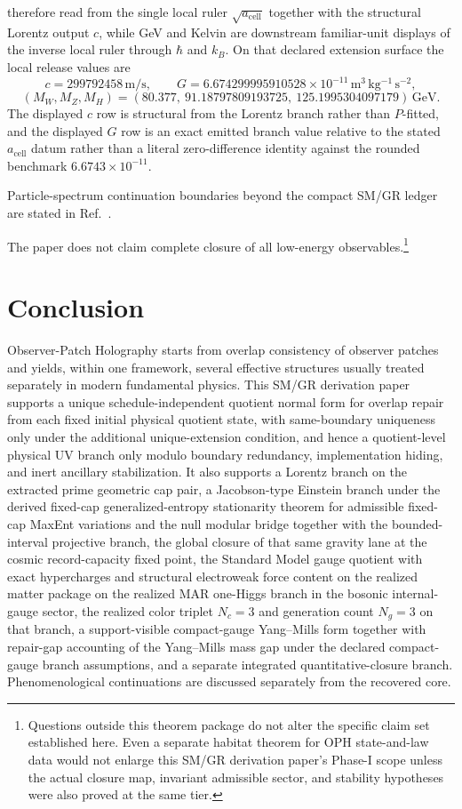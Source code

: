 \documentclass[11pt]{article}
\begin{document}
therefore read from the single local ruler \(\sqrt{a_{\mathrm{cell}}}\) together with the
structural Lorentz output \(c\), while GeV and Kelvin are downstream familiar-unit displays of the
inverse local ruler through \(\hbar\) and \(k_B\).
On that declared extension surface the local release values are
\[
c=299792458\,\mathrm{m/s},
\qquad
G=6.674299995910528\times10^{-11}\,\mathrm{m^3\,kg^{-1}\,s^{-2}},
\]
\[
(M_W,M_Z,M_H)=
(80.377,\ 91.18797809193725,\ 125.1995304097179)\,\mathrm{GeV}.
\]
The displayed \(c\) row is structural from the Lorentz branch rather than \(P\)-fitted, and the
displayed \(G\) row is an exact emitted branch value relative to the stated \(a_{\mathrm{cell}}\)
datum rather than a literal zero-difference identity against the rounded benchmark
\(6.6743\times10^{-11}\).

Particle-spectrum continuation boundaries beyond the compact SM/GR ledger are stated in Ref.~\cite{ophparticles}.

The paper does not claim complete closure of all low-energy observables.\footnote{Questions outside this theorem package do not alter the specific claim set established here. Even a separate habitat theorem for OPH state-and-law data would not enlarge this SM/GR derivation paper's Phase-I scope unless the actual closure map, invariant admissible sector, and stability hypotheses were also proved at the same tier.}
\section{Conclusion}

Observer-Patch Holography starts from overlap consistency of observer patches and yields, within one framework, several effective structures usually treated separately in modern fundamental physics. This SM/GR derivation paper supports a unique schedule-independent quotient normal form for overlap repair from each fixed initial physical quotient state, with same-boundary uniqueness only under the additional unique-extension condition, and hence a quotient-level physical UV branch only modulo boundary redundancy, implementation hiding, and inert ancillary stabilization. It also supports a Lorentz branch on the extracted prime geometric cap pair, a Jacobson-type Einstein branch under the derived fixed-cap generalized-entropy stationarity theorem for admissible fixed-cap MaxEnt variations and the null modular bridge together with the bounded-interval projective branch, the global closure of that same gravity lane at the cosmic record-capacity fixed point, the Standard Model gauge quotient with exact hypercharges and structural electroweak force content on the realized matter package on the realized MAR one-Higgs branch in the bosonic internal-gauge sector, the realized color triplet \(N_c=3\) and generation count \(N_g=3\) on that branch, a support-visible compact-gauge Yang--Mills form together with repair-gap accounting of the Yang--Mills mass gap under the declared compact-gauge branch assumptions, and a separate integrated quantitative-closure branch. Phenomenological continuations are discussed separately from the recovered core.
\end{document}
